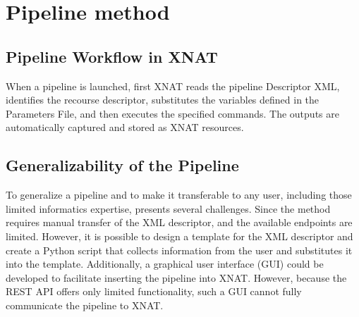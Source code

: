 \section{Pipeline method}
\subsection{Pipeline Workflow in XNAT}
When a pipeline is launched, first XNAT reads the pipeline Descriptor XML, identifies the recourse descriptor, substitutes the variables defined in the Parameters File, and then executes the specified commands. The outputs are automatically captured and stored as XNAT resources.

\subsection{Generalizability of the Pipeline}
\normalsize
To generalize a pipeline and to make it transferable to any user, including those limited informatics expertise, presents several challenges.
Since the method requires manual transfer of the XML descriptor,  and the available endpoints are limited. 
However, it is possible to design a template for the XML descriptor and create a Python script that collects information from the user and substitutes it into the template. Additionally, a graphical user interface (GUI) could be developed to facilitate inserting the pipeline into XNAT. However, because the REST API offers only limited functionality, such a GUI cannot fully communicate the pipeline to XNAT.






